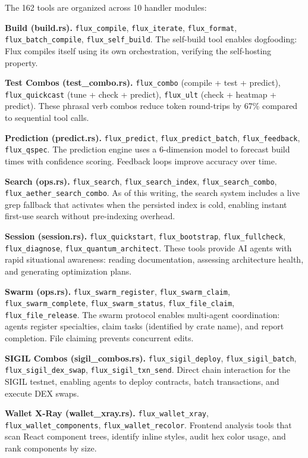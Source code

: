 \documentclass[11pt,a4paper]{article}
\begin{document}
The 162 tools are organized across 10 handler modules:

\textbf{Build (build.rs).} \texttt{flux\_compile}, \texttt{flux\_iterate}, \texttt{flux\_format}, \texttt{flux\_batch\_compile}, \texttt{flux\_self\_build}. The self-build tool enables dogfooding: Flux compiles itself using its own orchestration, verifying the self-hosting property.

\textbf{Test Combos (test\_combo.rs).} \texttt{flux\_combo} (compile + test + predict), \texttt{flux\_quickcast} (tune + check + predict), \texttt{flux\_ult} (check + heatmap + predict). These phrasal verb combos reduce token round-trips by 67\% compared to sequential tool calls.

\textbf{Prediction (predict.rs).} \texttt{flux\_predict}, \texttt{flux\_predict\_batch}, \texttt{flux\_feedback}, \texttt{flux\_qspec}. The prediction engine uses a 6-dimension model to forecast build times with confidence scoring. Feedback loops improve accuracy over time.

\textbf{Search (ops.rs).} \texttt{flux\_search}, \texttt{flux\_search\_index}, \texttt{flux\_search\_combo}, \texttt{flux\_aether\_search\_combo}. As of this writing, the search system includes a live grep fallback that activates when the persisted index is cold, enabling instant first-use search without pre-indexing overhead.

\textbf{Session (session.rs).} \texttt{flux\_quickstart}, \texttt{flux\_bootstrap}, \texttt{flux\_fullcheck}, \texttt{flux\_diagnose}, \texttt{flux\_quantum\_architect}. These tools provide AI agents with rapid situational awareness: reading documentation, assessing architecture health, and generating optimization plans.

\textbf{Swarm (ops.rs).} \texttt{flux\_swarm\_register}, \texttt{flux\_swarm\_claim}, \texttt{flux\_swarm\_complete}, \texttt{flux\_swarm\_status}, \texttt{flux\_file\_claim}, \texttt{flux\_file\_release}. The swarm protocol enables multi-agent coordination: agents register specialties, claim tasks (identified by crate name), and report completion. File claiming prevents concurrent edits.

\textbf{SIGIL Combos (sigil\_combos.rs).} \texttt{flux\_sigil\_deploy}, \texttt{flux\_sigil\_batch}, \texttt{flux\_sigil\_dex\_swap}, \texttt{flux\_sigil\_txn\_send}. Direct chain interaction for the SIGIL testnet, enabling agents to deploy contracts, batch transactions, and execute DEX swaps.

\textbf{Wallet X-Ray (wallet\_xray.rs).} \texttt{flux\_wallet\_xray}, \texttt{flux\_wallet\_components}, \texttt{flux\_wallet\_recolor}. Frontend analysis tools that scan React component trees, identify inline styles, audit hex color usage, and rank components by size.
\end{document}
